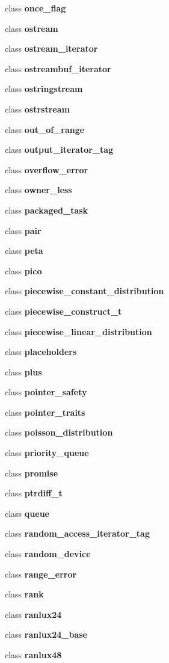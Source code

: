 \begin{DoxyCompactItemize}
class \textbf{ once\+\_\+flag}
\item 
class \textbf{ ostream}
\item 
class \textbf{ ostream\+\_\+iterator}
\item 
class \textbf{ ostreambuf\+\_\+iterator}
\item 
class \textbf{ ostringstream}
\item 
class \textbf{ ostrstream}
\item 
class \textbf{ out\+\_\+of\+\_\+range}
\item 
class \textbf{ output\+\_\+iterator\+\_\+tag}
\item 
class \textbf{ overflow\+\_\+error}
\item 
class \textbf{ owner\+\_\+less}
\item 
class \textbf{ packaged\+\_\+task}
\item 
class \textbf{ pair}
\item 
class \textbf{ peta}
\item 
class \textbf{ pico}
\item 
class \textbf{ piecewise\+\_\+constant\+\_\+distribution}
\item 
class \textbf{ piecewise\+\_\+construct\+\_\+t}
\item 
class \textbf{ piecewise\+\_\+linear\+\_\+distribution}
\item 
class \textbf{ placeholders}
\item 
class \textbf{ plus}
\item 
class \textbf{ pointer\+\_\+safety}
\item 
class \textbf{ pointer\+\_\+traits}
\item 
class \textbf{ poisson\+\_\+distribution}
\item 
class \textbf{ priority\+\_\+queue}
\item 
class \textbf{ promise}
\item 
class \textbf{ ptrdiff\+\_\+t}
\item 
class \textbf{ queue}
\item 
class \textbf{ random\+\_\+access\+\_\+iterator\+\_\+tag}
\item 
class \textbf{ random\+\_\+device}
\item 
class \textbf{ range\+\_\+error}
\item 
class \textbf{ rank}
\item 
class \textbf{ ranlux24}
\item 
class \textbf{ ranlux24\+\_\+base}
\item 
class \textbf{ ranlux48}

\end{DoxyCompactItemize}
